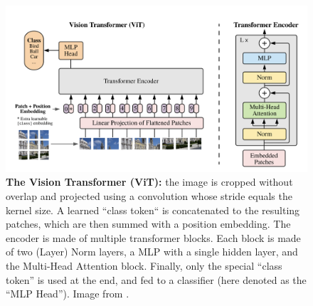 \begin{figure}[tb]
      \begin{center}
            \includegraphics[width=\linewidth]{images/related/vit.png}
      \end{center}
      \caption{\textbf{The Vision Transformer (ViT):} the image is cropped without overlap and
            projected using a convolution whose stride equals the kernel size. A learned ``class
            token`` is concatenated to the resulting patches, which are then summed with a position
            embedding. The encoder is made of multiple transformer blocks. Each block is made of two
            (Layer) Norm layers, a MLP with a single hidden layer, and the Multi-Head Attention
            block. Finally, only the special ``class token'' is used at the end, and fed to a
            classifier (here denoted as the ``MLP Head''). Image from \citet{dosovitskiy2020vit}.}
      \label{fig:related_vit}
\end{figure}


